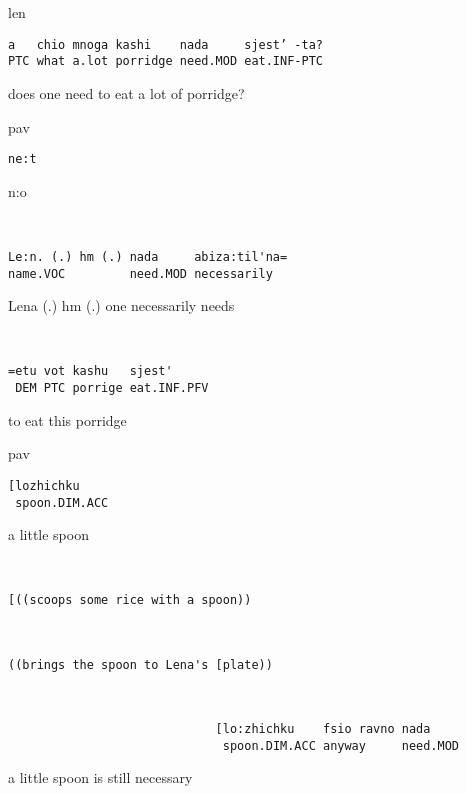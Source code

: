 \documentclass[output=paper,modfonts,nonflat]{langsci/langscibook}
\begin{document}
\newpage
{}\vspace{2mm}
%
\begin{transbox}{1}{len}
\begin{verbatim}
a   chio mnoga kashi    nada     sjest’ -ta?
PTC what a.lot porridge need.MOD eat.INF-PTC
\end{verbatim}
does one need to eat a lot of porridge?
\end{transbox}
%
\begin{transbox}{2}{pav}
\begin{verbatim}
ne:t
\end{verbatim}
n:o
\end{transbox}
%
\begin{mdframednoverticalspace}[style=firstfoc]
\begin{transbox}{3}{~}
\begin{verbatim}
Le:n. (.) hm (.) nada     abiza:til'na=
name.VOC         need.MOD necessarily
\end{verbatim}
Lena (.) hm (.) one necessarily needs
\end{transbox}
\end{mdframednoverticalspace}
%
\begin{mdframednoverticalspace}[style=firstfoc]
\begin{transbox}{4}{~}
\begin{verbatim}
=etu vot kashu   sjest'
 DEM PTC porrige eat.INF.PFV
\end{verbatim}
\hspace{0.07cm} to eat this porridge
\end{transbox}
\end{mdframednoverticalspace}
%
%
\begin{mdframednoverticalspace}[style=firstfoc]
\begin{transbox}{6}{pav}
\begin{verbatim}
[lozhichku
 spoon.DIM.ACC
\end{verbatim}
\hspace{0.07cm} a little spoon
\end{transbox}
\end{mdframednoverticalspace}
%
\begin{transbox}{7}{~}
\begin{verbatim}
[((scoops some rice with a spoon))
\end{verbatim}
\end{transbox}
%
\begin{transbox}{8}{~}
\begin{verbatim}
((brings the spoon to Lena's [plate))
\end{verbatim}
\end{transbox}\vspace{-1mm}
%
\begin{transbox}{9}{~}
\begin{verbatim}
                             [lo:zhichku    fsio ravno nada
                              spoon.DIM.ACC anyway     need.MOD
\end{verbatim}
\hspace{4.5cm} a little spoon is still necessary
\end{transbox}\bigskip
\end{document}
